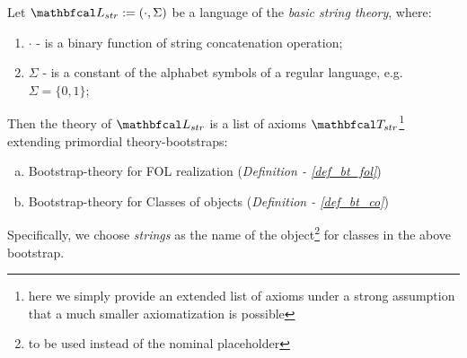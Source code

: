 \begin{definition}\label{def_ExtStrTheory}
  Let $\lsign_{str} := (\cdot, \Sigma)$ be a language of the \textit{basic string theory}, where:
  \begin{enumerate}
    \item $\cdot$ - is a binary function of string concatenation operation;
    \item $\Sigma$ - is a constant of the alphabet symbols of a regular language, e.g. $\Sigma = \{0,1\}$;
  \end{enumerate}
  
  Then the theory of $\lsign_{str}$ is a list of axioms $\LsT_{str}$\footnote{here we simply provide an extended list of axioms under a strong assumption that a much smaller axiomatization is possible} extending primordial theory-bootstraps:
  \begin{enumerate}[(a)]
    \item Bootstrap-theory for FOL realization (\textit{Definition - \ref{def_bt_fol}})
    \item Bootstrap-theory for Classes of objects (\textit{Definition - \ref{def_bt_co}})
  \end{enumerate}
  Specifically, we choose \textit{strings} as the name of the object\footnote{to be used instead of the nominal placeholder} for classes in the above bootstrap.
  

\end{definition}

